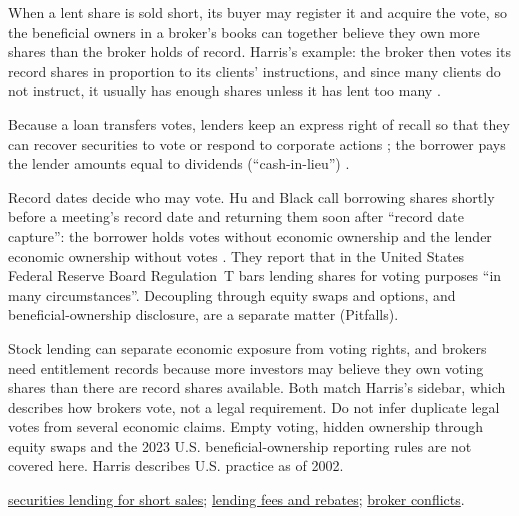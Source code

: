 \begin{qfdefinition}
When a lent share is sold short, its buyer may register it and acquire the vote, so the beneficial owners in a broker's books can together believe they own more shares than the broker holds of record. Harris's example: the broker then votes its record shares in proportion to its clients' instructions, and since many clients do not instruct, it usually has enough shares unless it has lent too many \citep[sidebar ``Can Investors Vote More Than 100 Percent of the Shares Outstanding?'', p.~169]{alpha-harris}.

Because a loan transfers votes, lenders keep an express right of recall so that they can recover securities to vote or respond to corporate actions \citep[Repo FAQ 13]{al-icma}; the borrower pays the lender amounts equal to dividends (``cash-in-lieu'') \citep[sec.~2, p.~8]{al-duffie}.

 Record dates decide who may vote. Hu and Black call borrowing shares shortly before a meeting's record date and returning them soon after ``record date capture'': the borrower holds votes without economic ownership and the lender economic ownership without votes \citep[working-paper version, sec.~2.2.3, p.~5]{cfd-hu-black-2007}. They report that in the United States Federal Reserve Board Regulation~T bars lending shares for voting purposes ``in many circumstances''. Decoupling through equity swaps and options, and beneficial-ownership disclosure, are a separate matter (Pitfalls).

 Stock lending can separate economic exposure from voting rights, and brokers need entitlement records because more investors may believe they own voting shares than there are record shares available. Both match Harris's sidebar, which describes how brokers vote, not a legal requirement. Do not infer duplicate legal votes from several economic claims. Empty voting, hidden ownership through equity swaps and the 2023 U.S. beneficial-ownership reporting rules are not covered here. Harris describes U.S. practice as of 2002.

 \hyperref[mech:securities-lending-short-sale]{securities lending for short sales}; \hyperref[def:securities-lending-fee-rebate]{lending fees and rebates}; \hyperref[def:broker-agency-conflicts]{broker conflicts}.

\end{qfdefinition}

